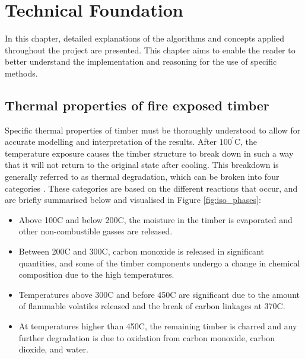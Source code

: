 \chapter{Technical Foundation} \label{tech}
In this chapter, detailed explanations of the algorithms and concepts applied throughout the project are presented. 
This chapter aims to enable the reader to better understand the implementation and reasoning for the use of specific methods.

\section{Thermal properties of fire exposed timber}

Specific thermal properties of timber must be thoroughly understood to allow for accurate modelling and interpretation of the results.
After $100 ^{^\circ}$C, the temperature exposure causes the timber structure to break down in such a way that it will not return to the original state after cooling.
This breakdown is generally referred to as thermal degradation, which can be broken into four categories \citep{White:2001} \citep{Shi:2021}.
These categories are based on the different reactions that occur, and are briefly summarised below and visualised in Figure \ref{fig:iso_phases}:

\begin{itemize}
\item Above 100\textdegree C and below 200\textdegree C, the moisture in the timber is evaporated and other non-combustible gasses are released.
\item Between 200\textdegree C and 300\textdegree C, carbon monoxide is released in significant quantities, and some of the timber components undergo a change in chemical composition due to the high temperatures.
\item Temperatures above  300\textdegree C and before 450\textdegree C are significant due to the amount of flammable volatiles released and the break of carbon linkages at 370\textdegree C.
\item At temperatures higher than 450\textdegree C, the remaining timber is charred and any further degradation is due to oxidation from carbon monoxide, carbon dioxide, and water.
\end{itemize}

